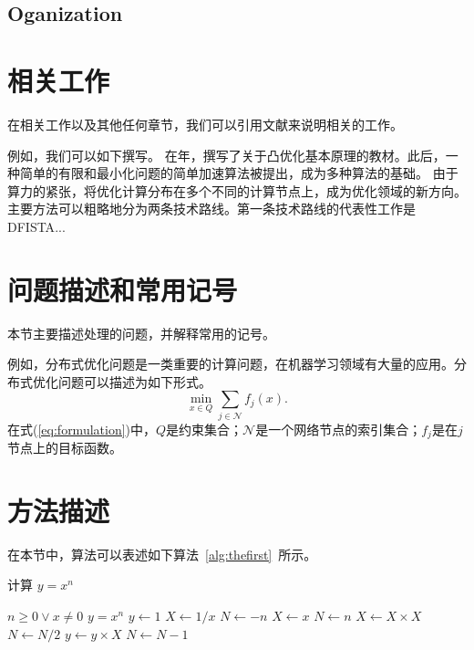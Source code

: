 \documentclass[a4paper,twoside,AutoFakeBold]{article}
\theoremstyle{definition}
\begin{document}
\lipsum[8]

\subsection{Oganization}
\lipsum[9]

{
\color{blue} %
\lipsum[10] %
}

%
\section{相关工作}\label{section:related}
在相关工作以及其他任何章节，我们可以引用文献来说明相关的工作。

{\color{blue}
例如，我们可以如下撰写。
在\citeyear{nesterov2013introductory}年，\citeauthor{nesterov2013introductory}撰写了关于凸优化基本原理的教材\cite{nesterov2013introductory}。此后，一种简单的有限和最小化问题的简单加速算法被提出\cite{defazio2016simple}，成为多种算法的基础\cite{eisen2017decentralized,davis2015convergence,colin2016gossip}。
%
由于算力的紧张，将优化计算分布在多个不同的计算节点上，成为优化领域的新方向。主要方法可以粗略地分为两条技术路线。第一条技术路线的代表性工作是DFISTA\cite{wu2016decentralized}...
}

\lipsum[6]

%
\section{问题描述和常用记号}\label{section:preliminary}
本节主要描述处理的问题，并解释常用的记号。

{\color{blue} 例如，分布式优化问题是一类重要的计算问题，在机器学习领域有大量的应用。分布式优化问题可以描述为如下形式。
\begin{equation}\label{eq:formulation}
\min_{x \in Q} \sum_{j \in \mathcal{N}} f_j(x).
\end{equation}
在式(\ref{eq:formulation})中，$Q$是约束集合；$\mathcal{N}$是一个网络节点的索引集合；$f_j$是在$j$节点上的目标函数。
}

\lipsum[7]

%
\section{方法描述}\label{section:methods}
在本节中，算法可以表述如下算法~\ref{alg:thefirst}~所示。

\begin{algorithm}[h]\xiaosi
\caption{\xiaosi 计算 $y = x^n$}\label{alg:thefirst}
\begin{algorithmic} 
\REQUIRE $n \geq 0 \vee x \neq 0$
\ENSURE $y = x^n$
\STATE $y \leftarrow 1$
\STATE $X \leftarrow 1 / x$
\STATE $N \leftarrow -n$
\ELSE
\STATE $X \leftarrow x$
\STATE $N \leftarrow n$
\ENDIF
{}
\STATE $X \leftarrow X \times X$
\STATE $N \leftarrow N / 2$
\ELSE[$N$ is odd]
\STATE $y \leftarrow y \times X$
\STATE $N \leftarrow N - 1$
\ENDIF
\ENDWHILE
\end{algorithmic}
\end{algorithm}
\end{document}
